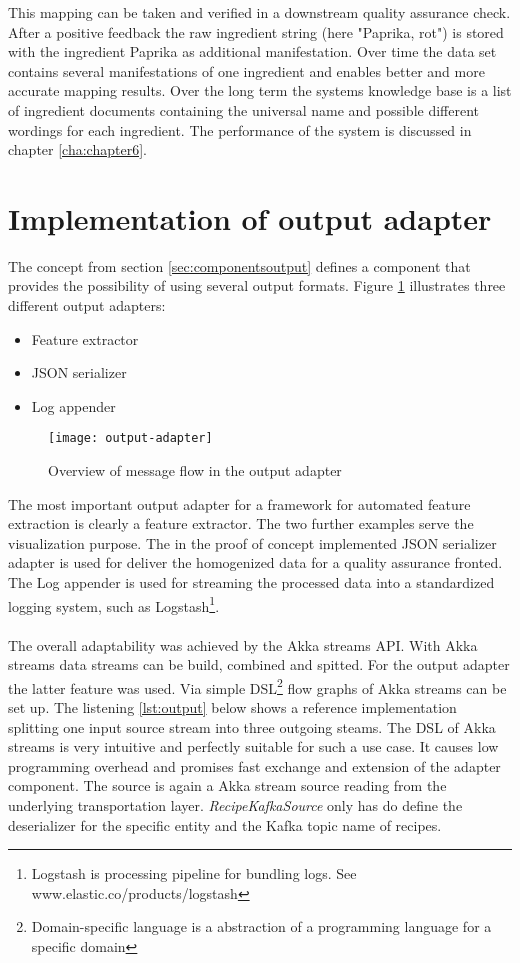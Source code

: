 This mapping can be taken and verified in a downstream quality assurance check. After a positive feedback the raw ingredient string (here "Paprika, rot") is stored with the ingredient Paprika as additional manifestation. Over time the data set contains several manifestations of one ingredient and enables better and more accurate mapping results. Over the long term the systems knowledge base is a list of ingredient documents containing the universal name and possible different wordings for each ingredient. The performance of the system is discussed in chapter \ref{cha:chapter6}.

\section{Implementation of output adapter}

The concept from section \ref{sec:componentsoutput} defines a component that provides the possibility of using several output formats. Figure \ref{fig:output-adapter} illustrates three different output adapters:
\begin{itemize}
\item Feature extractor
\item JSON serializer
\item Log appender
\end{itemize}

\begin{figure}[htb]
  \centering
  \texttt{[image: output-adapter]}\\
  \caption{Overview of message flow in the output adapter}
  \label{fig:output-adapter}
\end{figure}

The most important output adapter for a framework for automated feature extraction is clearly a feature extractor. The two further examples serve the visualization purpose. The in the proof of concept implemented JSON serializer adapter is used for deliver the homogenized data for a quality assurance fronted. The Log appender is used for streaming the processed data into a standardized logging system, such as Logstash\footnote{Logstash is processing pipeline for bundling logs. See www.elastic.co/products/logstash}. 
\\\\
The overall adaptability was achieved by the Akka streams API. With Akka streams data streams can be build, combined and spitted. For the output adapter the latter feature was used. Via simple DSL\footnote{Domain-specific language is a abstraction of a programming language for a specific domain} flow graphs of Akka streams can be set up. The listening \ref{lst:output} below shows a reference implementation splitting one input source stream into three outgoing steams. The DSL of Akka streams is very intuitive and perfectly suitable for such a use case. It causes low programming overhead and promises fast exchange and extension of the adapter component. The source is again a Akka stream source reading from the underlying transportation layer. \textit{RecipeKafkaSource} only has do define the deserializer for the specific entity and the Kafka topic name of recipes.

